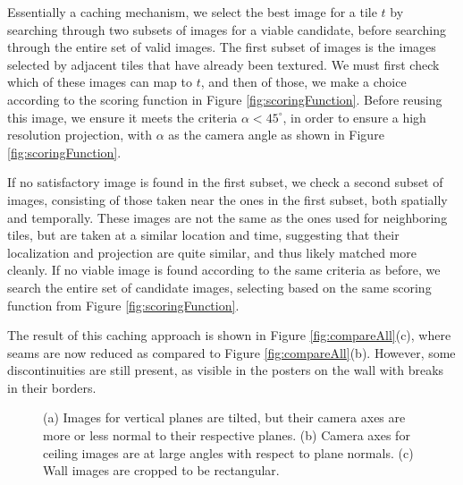 \documentclass[]{spie}  %
\begin{document}
Essentially a caching mechanism, we select the best image for a tile
$t$ by searching through two subsets of images for a viable candidate,
before searching through the entire set of valid images. The first
subset of images is the images selected by adjacent tiles that have
already been textured. We must first check which of these images can
map to $t$, and then of those, we make a choice according to the
scoring function in Figure \ref{fig:scoringFunction}. Before reusing
this image, we ensure it meets the criteria $\alpha < 45^\circ$, in
order to ensure a high resolution projection, with $\alpha$ as the
camera angle as shown in Figure \ref{fig:scoringFunction}.

If no satisfactory image is found in the first subset, we check a
second subset of images, consisting of those taken near the ones in
the first subset, both spatially and temporally. These images are not
the same as the ones used for neighboring tiles, but are taken at a
similar location and time, suggesting that their localization and
projection are quite similar, and thus likely matched more cleanly. If
no viable image is found according to the same criteria as before, we
search the entire set of candidate images, selecting based on the same
scoring function from Figure \ref{fig:scoringFunction}.

The result of this caching approach is shown in Figure
\ref{fig:compareAll}(c), where seams are now reduced as compared to
Figure \ref{fig:compareAll}(b). However, some discontinuities are
still present, as visible in the posters on the wall with breaks in
their borders.

\begin{figure}
  \centering
  \centering
  \centering
  \caption{(a) Images for vertical planes are tilted, but their camera
    axes are more or less normal to their respective planes. (b)
    Camera axes for ceiling images are at large angles with respect to
    plane normals. (c) Wall images are cropped to be rectangular.}
  \label{fig:projectionAngles}
\end{figure}
\end{document}

